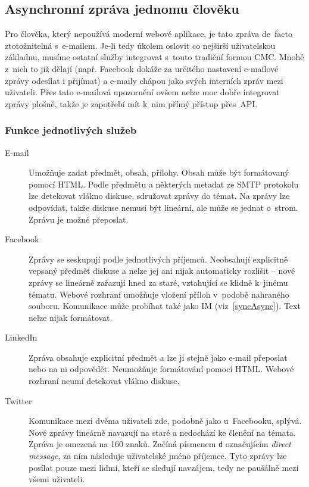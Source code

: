 \documentclass[12pt,oneside,final]{fithesis2}
\begin{document}
\subsection{Asynchronní zpráva jednomu člověku}
Pro člověka, který nepoužívá moderní webové aplikace, je tato zpráva de~facto ztotožnitelná s~e-mailem. Je-li tedy úkolem oslovit co nejširší uživatelskou základnu, musíme ostatní služby integrovat s~touto tradiční formou CMC. Mnohé z~nich to již dělají (např. Facebook dokáže za určitého nastavení e-mailové zprávy odesílat i přijímat) a e-maily chápou jako  svých interních zpráv mezi uživateli. Přes tato e-mailová upozornění ovšem nelze moc dobře integrovat zprávy plošně, takže je zapotřebí mít k~nim přímý přístup přes~API.

\subsubsection*{Funkce jednotlivých služeb}
\begin{description}
    \item[E-mail]
        Umožňuje zadat předmět, obsah, přílohy. Obsah může být formátovaný pomocí HTML. Podle předmětu a některých metadat ze SMTP protokolu lze detekovat vlákno diskuse, sdružovat zprávy do témat. Na zprávy lze odpovídat, takže diskuse nemusí být lineární, ale může se jednat o~strom. Zprávu je možné přeposlat.

    \item[Facebook]
        Zprávy se seskupují podle jednotlivých příjemců. Neobsahují explicitně ve\-psa\-ný před\-mět diskuse a nelze jej ani nijak automaticky rozlišit -- nové zprávy se lineárně zařazují hned za staré, vztahující se klidně k~jinému tématu. Webové rozhraní umožňuje vložení příloh v~podobě nahraného souboru. Komunikace může probíhat také jako IM (viz~\ref{syncAsync}). Text nelze nijak formátovat.

    \item[LinkedIn]
        Zpráva obsahuje explicitní předmět a lze ji stejně jako e-mail pře\-pos\-lat nebo na ni odpovědět. Neumožňuje formátování pomocí HTML. Webové rozhraní neumí detekovat vlákno diskuse.

    \item[Twitter]
        Komunikace mezi dvěma uživateli zde, podobně jako u~Fa\-ce\-boo\-ku, splý\-vá. Nové zprávy lineárně navazují na staré a nedochází ke členění na témata. Zpráva je omezená na 160 znaků. Začíná písmenem {\tt d} označujícím \emph{direct message}, za ním následuje uživatelské jméno příjemce. Tyto zprávy lze posílat pouze mezi lidmi, kteří se sledují navzájem, tedy ne paušálně mezi všemi uživateli.
\end{description}
\end{document}
